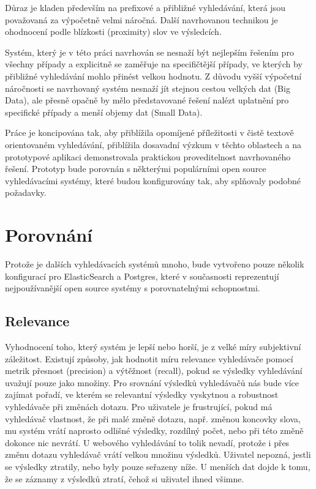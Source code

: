 \documentclass[11pt,letterpaper,oneside,openright]{book}
\begin{document}

Důraz je kladen především na prefixové a přibližné vyhledávání, která jsou
považovaná za výpočetně velmi náročná. Další navrhovanou technikou je
ohodnocení podle blízkosti (proximity) slov ve výsledcích.

Systém, který je v této práci navrhován se nesnaží být nejlepším řešením pro
všechny případy a explicitně se zaměřuje na specifičtější případy, ve kterých
by přibližné vyhledávání mohlo přinést velkou hodnotu. Z důvodu vyšší výpočetní
náročnosti se navrhovaný systém nesnaží jít stejnou cestou velkých dat (Big
Data), ale přesně opačně by mělo představované řešení nalézt uplatnění pro
specifické případy a menší objemy dat (Small Data).

Práce je koncipována tak, aby přiblížila opomíjené příležitosti v čistě textově
orientovaném vyhledávání, přiblížila dosavadní výzkum v těchto oblastech a na
prototypové aplikaci demonstrovala praktickou proveditelnost navrhovaného
řešení. Prototyp bude porovnán s některými populárními open source
vyhledávacími systémy, které budou konfigurovány tak, aby splňovaly podobné
požadavky.

\section{Porovnání}
Protože je dalších vyhledávacích systémů mnoho, bude vytvořeno pouze několik
konfigurací pro ElasticSearch a Postgres, které v současnosti reprezentují
nejpoužívanější open source systémy s porovnatelnými schopnostmi.

\subsection{Relevance}
Vyhodnocení toho, který systém je lepší nebo horší, je z velké míry subjektivní
záležitost. Existují způsoby, jak hodnotit míru relevance vyhledávače pomocí
metrik přesnost (precision) a výtěžnost (recall), pokud se výsledky vyhledávání
uvažují pouze jako množiny. Pro srovnání výsledků vyhledávačů nás bude více
zajímat pořadí, ve kterém se relevantní výsledky vyskytnou a robustnost
vyhledávače při změnách dotazu. Pro uživatele je frustrující, pokud má
vyhledávač vlastnost, že při malé změně dotazu, např.  změnou koncovky slova,
mu systém vrátí naprosto odlišné výsledky, rozdílný počet, nebo při této změně
dokonce nic nevrátí. U webového vyhledávání to tolik nevadí, protože i přes
změnu dotazu vyhledávač vrátí velkou množinu výsledků.  Uživatel nepozná,
jestli se výsledky ztratily, nebo byly pouze seřazeny níže. U menších dat dojde
k tomu, že se záznamy z výsledků ztratí, čehož si uživatel ihned všimne.
\end{document}

